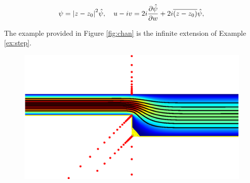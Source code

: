 \documentclass{article}
\newcounter{example}[section]
\newcommand{\conj}[1]{{\overline{#1}}}
\begin{document}
\begin{equation}
\psi = \abs{z-z_0}^2 \hat{\psi}, \quad u-iv = 2i\frac{\partial \hat{\psi}}{\partial w} + 2i \conj{(z-z_0)} \hat{\psi},
\end{equation}

The example provided in Figure \ref{fig:chan} is the infinite extension of Example \ref{ex:step}.
\begin{figure}[H]
	\centering
	\includegraphics[width=\linewidth]{Figures/chan}
	

\end{figure}
\end{document}
